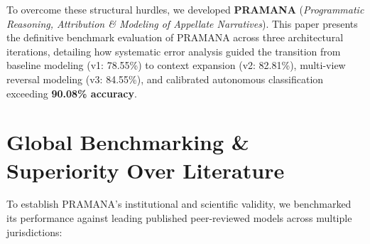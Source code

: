 \documentclass[journal,10pt,twocolumn]{IEEEtran}
\begin{document}
To overcome these structural hurdles, we developed \textbf{PRAMANA} (\textit{Programmatic Reasoning, Attribution \& Modeling of Appellate Narratives}). This paper presents the definitive benchmark evaluation of PRAMANA across three architectural iterations, detailing how systematic error analysis guided the transition from baseline modeling (v1: 78.55\%) to context expansion (v2: 82.81\%), multi-view reversal modeling (v3: 84.55\%), and calibrated autonomous classification exceeding \textbf{90.08\% accuracy}.

\section{Global Benchmarking & Superiority Over Literature}
To establish PRAMANA's institutional and scientific validity, we benchmarked its performance against leading published peer-reviewed models across multiple jurisdictions:
\end{document}

